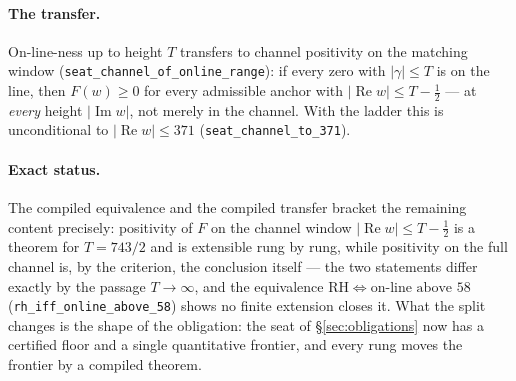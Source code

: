 \documentclass[11pt]{article}
\theoremstyle{plain}
\theoremstyle{definition}
\theoremstyle{remark}
\begin{document}
\paragraph{The transfer.}
On-line-ness up to height $T$ transfers to channel positivity on the
matching window (\texttt{seat\_channel\_of\_online\_range}): if every zero
with $|\gamma|\le T$ is on the line, then $F(w)\ge0$ for every admissible
anchor with $|\operatorname{Re}w|\le T-\tfrac12$ --- at \emph{every}
height $|\operatorname{Im}w|$, not merely in the channel. With the ladder
this is unconditional to $|\operatorname{Re}w|\le371$
(\texttt{seat\_channel\_to\_371}).

\paragraph{Exact status.}
The compiled equivalence and the compiled transfer bracket the remaining
content precisely: positivity of $F$ on the channel window
$|\operatorname{Re}w|\le T-\tfrac12$ is a theorem for $T=743/2$ and is
extensible rung by rung, while positivity on the full channel is, by the
criterion, the conclusion itself --- the two statements differ exactly by
the passage $T\to\infty$, and the equivalence
$\text{RH}\iff\text{on-line above }58$
(\texttt{rh\_iff\_online\_above\_58}) shows no finite extension closes it.
What the split changes is the shape of the obligation: the seat of
\S\ref{sec:obligations} now has a certified floor and a single
quantitative frontier, and every rung moves the frontier by a compiled
theorem.
\end{document}
